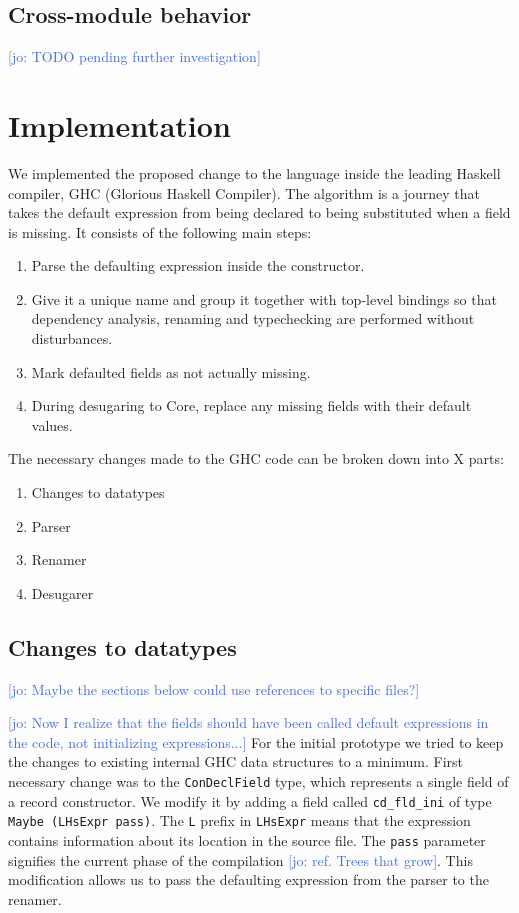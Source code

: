 \documentclass[en]{pracamgr}
\newcommand{\jcom}[1]{\textcolor{RoyalBlue}{[jo: #1]}}
\begin{document}
\section{Cross-module behavior}
\jcom{TODO pending further investigation}

\chapter{Implementation}

We implemented the proposed change to the language inside the leading Haskell compiler, GHC (Glorious Haskell Compiler).
The algorithm is a journey that takes the default expression from being declared to being substituted when a field is missing.
It consists of the following main steps:
\begin{enumerate}
  \item Parse the defaulting expression inside the constructor.
  \item Give it a unique name and group it together with top-level bindings so that dependency analysis, renaming and typechecking are performed without disturbances.
  \item Mark defaulted fields as not actually missing.
  \item During desugaring to Core, replace any missing fields with their default values.
\end{enumerate}

The necessary changes made to the GHC code can be broken down into X parts:
\begin{enumerate}
  \item Changes to datatypes
  \item Parser
  \item Renamer
  \item Desugarer
\end{enumerate}

\section{Changes to datatypes} \jcom{Maybe the sections below could use references to specific files?}

\jcom{Now I realize that the fields should have been called default expressions in the code, not initializing expressions...}
For the initial prototype we tried to keep the changes to existing internal GHC data structures to a minimum.
First necessary change was to the \texttt{ConDeclField} type, which represents a single field of a record constructor.
We modify it by adding a field called \texttt{cd\_fld\_ini} of type \texttt{Maybe (LHsExpr pass)}. 
The \texttt{L} prefix in \texttt{LHsExpr} means that the expression contains information about its location in the source file.
The \texttt{pass} parameter signifies the current phase of the compilation \jcom{ref. Trees that grow}.
This modification allows us to pass the defaulting expression from the parser to the renamer.
\end{document}
